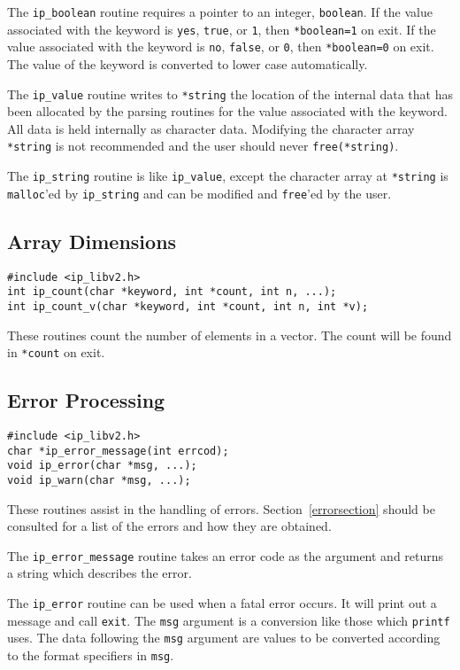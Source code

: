 The \verb|ip_boolean| routine requires a pointer to an integer, \verb|boolean|.
If the value associated with the keyword is \verb|yes|, \verb|true|, or
\verb|1|, then \verb|*boolean=1| on exit.
If the value associated with the keyword is \verb|no|, \verb|false|, or
\verb|0|, then \verb|*boolean=0| on exit.
The value of the keyword is converted to lower case automatically.

The \verb|ip_value| routine writes to \verb|*string| the location of
the internal data that has been allocated by the parsing routines for
the value associated with the keyword.  All data is held internally as
character data.  Modifying the character array \verb|*string| is not
recommended and the user should never \verb|free(*string)|.

The \verb|ip_string| routine is like \verb|ip_value|, except the
character array at \verb|*string| is \verb|malloc|'ed by \verb|ip_string|
and can be modified and \verb|free|'ed by the user.

\subsection{Array Dimensions}
\begin{verbatim}
#include <ip_libv2.h>
int ip_count(char *keyword, int *count, int n, ...);
int ip_count_v(char *keyword, int *count, int n, int *v);
\end{verbatim}
These routines count the number of elements in a vector.  The count
will be found in \verb|*count| on exit.

\subsection{Error Processing}
\begin{verbatim}
#include <ip_libv2.h>
char *ip_error_message(int errcod);
void ip_error(char *msg, ...);
void ip_warn(char *msg, ...);
\end{verbatim}
These routines assist in the handling of errors.  Section~\ref{errorsection}
should be consulted for a list of the errors and how they are obtained.

The \verb|ip_error_message| routine takes an error code as the argument
and returns a string which describes the error.

The \verb|ip_error| routine can be used when a fatal error occurs.  It
will print out a message and call \verb|exit|.  The \verb|msg| argument
is a conversion like those which \verb|printf| uses.  The data following
the \verb|msg| argument are values to be converted according to the
format specifiers in \verb|msg|.

